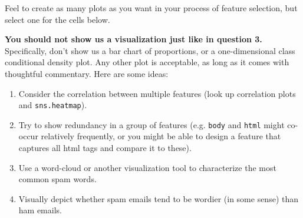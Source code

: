 \documentclass[11pt]{article}
\providecommand{\tightlist}{%
      \setlength{\itemsep}{0pt}\setlength{\parskip}{0pt}}
\begin{document}
Feel to create as many plots as you want in your process of feature
selection, but select one for the cells below.

\textbf{You should not show us a visualization just like in question 3.}
Specifically, don't show us a bar chart of proportions, or a
one-dimensional class conditional density plot. Any other plot is
acceptable, as long as it comes with thoughtful commentary. Here are
some ideas:

\begin{enumerate}
\def\labelenumi{\arabic{enumi}.}
\tightlist
\item
  Consider the correlation between multiple features (look up
  correlation plots and \texttt{sns.heatmap}).
\item
  Try to show redundancy in a group of features (e.g. \texttt{body} and
  \texttt{html} might co-occur relatively frequently, or you might be
  able to design a feature that captures all html tags and compare it to
  these).
\item
  Use a word-cloud or another visualization tool to characterize the
  most common spam words.
\item
  Visually depict whether spam emails tend to be wordier (in some sense)
  than ham emails.
\end{enumerate}
\end{document}
